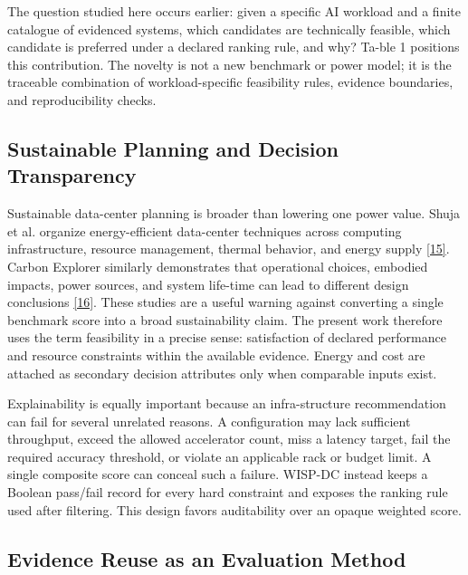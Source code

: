 \documentclass[final,3p,12pt,nopreprintline]{elsarticle}
\begin{document}
The question studied here occurs earlier: given a specific AI workload and a finite catalogue of evidenced systems, which candidates are technically feasible, which candidate is preferred under a declared ranking rule, and why? Ta-ble 1 positions this contribution. The novelty is not a new benchmark or power model; it is the traceable combination of workload-specific feasibility rules, evidence boundaries, and reproducibility checks.


\subsection{Sustainable Planning and Decision Transparency}


Sustainable data-center planning is broader than lowering one power value. Shuja et al. organize energy-efficient data-center techniques across computing infrastructure, resource management, thermal behavior, and energy supply \hyperref[ref:15]{[15]}. Carbon Explorer similarly demonstrates that operational choices, embodied impacts, power sources, and system life-time can lead to different design conclusions \hyperref[ref:16]{[16]}. These studies are a useful warning against converting a single benchmark score into a broad sustainability claim. The present work therefore uses the term feasibility in a precise sense: satisfaction of declared performance and resource constraints within the available evidence. Energy and cost are attached as secondary decision attributes only when comparable inputs exist.


Explainability is equally important because an infra-structure recommendation can fail for several unrelated reasons. A configuration may lack sufficient throughput, exceed the allowed accelerator count, miss a latency target, fail the required accuracy threshold, or violate an applicable rack or budget limit. A single composite score can conceal such a failure. WISP-DC instead keeps a Boolean pass/fail record for every hard constraint and exposes the ranking rule used after filtering. This design favors auditability over an opaque weighted score.


\subsection{Evidence Reuse as an Evaluation Method}
\end{document}

